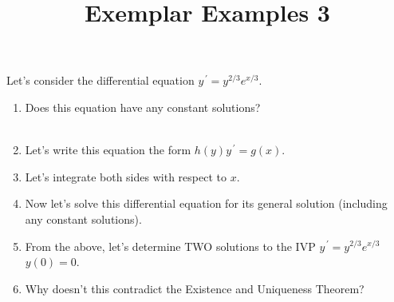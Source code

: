 \documentclass{ximera}
\begin{document}
\begin{abstract}
 \end{abstract}

    \title{Exemplar Examples 3}
    
    \maketitle


Let's consider the differential equation $y^{\,\prime}=y^{2/3}e^{x/3}$.\\


\begin{enumerate}

\item Does this equation have any constant solutions?\\ \\


\item Let's write this equation the form $h(y)y^{\,\prime}=g(x)$.

\vfill


\item Let's integrate both sides with respect to $x$.


\vfill


\item Now let's solve this differential equation for its general solution (including any constant solutions).



\vfill

\vfill

\vfill

\item  From the above, let's determine TWO solutions to the IVP $y^{\,\prime}=y^{2/3}e^{x/3}$ $y(0)=0$.



\vfill

\newpage

\item Why doesn't this contradict the Existence and Uniqueness Theorem?

\end{enumerate}
\end{document}
